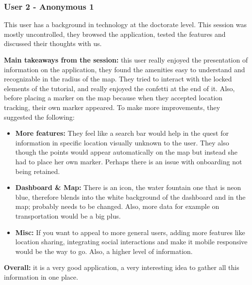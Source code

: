 \newpage

\subsubsection{User 2 - Anonymous 1}
This user has a background in technology at the doctorate level. This session
was mostly uncontrolled, they browsed the application, tested the features and
discussed their thoughts with us.

\textbf{Main takeaways from the session: } this user really enjoyed the
presentation of information on the application, they found the amenities easy to
understand and recognizable in the radius of the map. They tried to interact
with the locked elements of the tutorial, and really enjoyed the confetti at the
end of it. Also, before placing a marker on the map because when they accepted
location tracking, their own marker appeared. To make more improvements, they
suggested the following:
\begin{itemize}
    \item \textbf{More features: }They feel like a search bar would help in the
    quest for information in specific location visually unknown to the user.
    They also though the points would appear automatically on the map but
    instead she had to place her own marker. Perhaps there is an issue with
    onboarding not being retained.
    \vspace{0.2cm}

    \item \textbf{Dashboard \& Map: }There is an icon, the water fountain one
    that is neon blue, therefore blends into the white background of the
    dashboard and in the map; probably needs to be changed. Also, more data for
    example on transportation would be a big plus.
    \vspace{0.2cm}

    \item \textbf{Misc: } If you want to appeal to more general users, adding
    more features like location sharing, integrating social interactions and
    make it mobile responsive would be the way to go. Also, a higher level of
    information.
\end{itemize}
\textbf{Overall: }it is a very good application, a very interesting idea to
gather all this information in one place.

